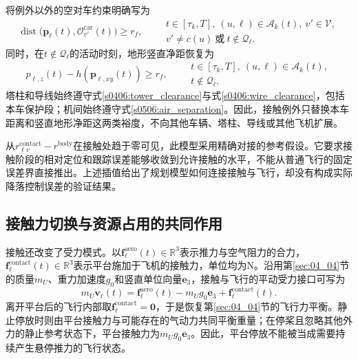 将例外以外的空对车约束明确写为
\begin{equation}
 \operatorname{dist}\bigl(\mathbf p_\ell(t),
                  \mathcal O_{v'}^{\mathrm{car}}(t)\bigr)\ge r_f,
 \qquad
 \substack{t\in[\tau_k,T],\ (u,\ell)\in\mathcal A_k(t),\ v'\in\mathcal V,\\
 v'\ne c(u)\ \text{或}\ t\notin\mathcal Q_\ell.}
 \label{s0506:ordinary_air_car}
\end{equation}
同时，在$t\notin\mathcal Q_\ell$的活动时刻，地形竖直净距恢复为
\begin{equation}
 p_{\ell,z}(t)-h(\mathbf p_{\ell,xy}(t))\ge r_f,
 \qquad
 \substack{t\in[\tau_k,T],\ (u,\ell)\in\mathcal A_k(t),\\t\notin\mathcal Q_\ell.}
 \label{s0506:ordinary_terrain}
\end{equation}
塔柱和导线始终遵守式\eqref{s0406:tower_clearance}与式\eqref{s0406:wire_clearance}，包括本车保护段；机间始终遵守式\eqref{s0506:air_separation}。因此，接触例外只替换本车距离和竖直地形净距这两类裕度，不向其他车辆、塔柱、导线或其他飞机扩展。

从$r_{\ell v}^{\mathrm{contact}}-r^{\mathrm{body}}$在接触处趋于零可见，此模型采用精确对接的参考假设。它要求接触阶段的相对定位和跟踪误差能够收敛到允许接触的水平，不能从普通飞行的固定误差界直接推出。上述插值给出了规划模型如何连接接触与飞行，却没有构成实际降落控制误差的验证结果。

\subsection{接触力切换与资源占用的共同作用}

接触还改变了受力模式。以$\mathbf f_\ell^{\mathrm{aero}}(t)\in\mathbb R^3$表示推力与空气阻力的合力，$\mathbf f_\ell^{\mathrm{contact}}(t)\in\mathbb R^3$表示平台施加于飞机的接触力，单位均为$\mathrm N$。沿用第\ref{sec:04_04}节的质量$m_U$、重力加速度$g_0$和竖直单位向量$\mathbf e_3$，接触与飞行的平动受力接口可写为
\begin{equation}
 m_U\dot{\mathbf v}_\ell(t)
 =\mathbf f_\ell^{\mathrm{aero}}(t)
  -m_Ug_0\mathbf e_3
  +\mathbf f_\ell^{\mathrm{contact}}(t).
 \label{s0506:contact_force_interface}
\end{equation}
离开平台后的飞行内部取$\mathbf f_\ell^{\mathrm{contact}}=\mathbf0$，于是恢复第\ref{sec:04_04}节的飞行力平衡。静止停放时则由平台接触力与可能存在的气动力共同平衡重量；在停桨且忽略其他外力的静止参考状态下，平台接触力为$m_Ug_0\mathbf e_3$。因此，平台停放不能被当成需要持续产生悬停推力的飞行状态。

